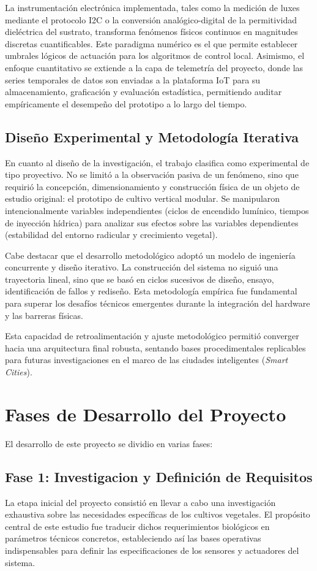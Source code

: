 La instrumentación electrónica implementada, tales como la medición de luxes mediante el protocolo I2C o la conversión analógico-digital de la permitividad dieléctrica del sustrato, transforma fenómenos físicos continuos en magnitudes discretas cuantificables. Este paradigma numérico es el que permite establecer umbrales lógicos de actuación para los algoritmos de control local. Asimismo, el enfoque cuantitativo se extiende a la capa de telemetría del proyecto, donde las series temporales de datos son enviadas a la plataforma IoT para su almacenamiento, graficación y evaluación estadística, permitiendo auditar empíricamente el desempeño del prototipo a lo largo del tiempo.

\subsection{Diseño Experimental y Metodología Iterativa}
En cuanto al diseño de la investigación, el trabajo clasifica como experimental de tipo proyectivo. No se limitó a la observación pasiva de un fenómeno, sino que requirió la concepción, dimensionamiento y construcción física de un objeto de estudio original: el prototipo de cultivo vertical modular. Se manipularon intencionalmente variables independientes (ciclos de encendido lumínico, tiempos de inyección hídrica) para analizar sus efectos sobre las variables dependientes (estabilidad del entorno radicular y crecimiento vegetal).

Cabe destacar que el desarrollo metodológico adoptó un modelo de ingeniería concurrente y diseño iterativo. La construcción del sistema no siguió una trayectoria lineal, sino que se basó en ciclos sucesivos de diseño, ensayo, identificación de fallos y rediseño. Esta metodología empírica fue fundamental para superar los desafíos técnicos emergentes durante la integración del hardware y las barreras físicas.  

Esta capacidad de retroalimentación y ajuste metodológico permitió converger hacia una arquitectura final robusta, sentando bases procedimentales replicables para futuras investigaciones en el marco de las ciudades inteligentes (\textit{Smart Cities}).

\section{Fases de Desarrollo del Proyecto}
El desarrollo de este proyecto se dividio en varias fases:
\subsection{Fase 1: Investigacion y Definición de Requisitos}
La etapa inicial del proyecto consistió en llevar a cabo una investigación exhaustiva sobre las necesidades específicas de los cultivos vegetales. El propósito central de este estudio fue traducir dichos requerimientos biológicos en parámetros técnicos concretos, estableciendo así las bases operativas indispensables para definir las especificaciones de los sensores y actuadores del sistema.

